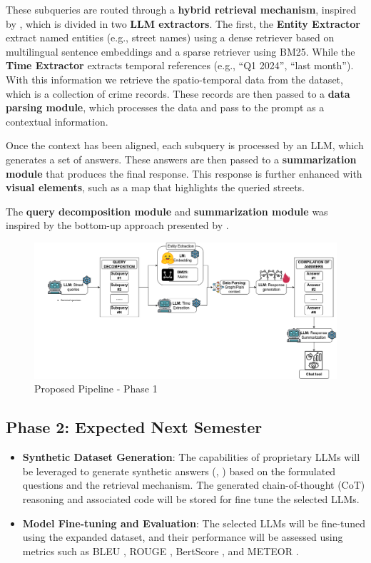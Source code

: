 These subqueries are routed through a \textbf{hybrid retrieval mechanism}, inspired by \cite{Guo2024LightRAG}, which is divided in two \textbf{LLM extractors}. The first, the \textbf{Entity Extractor} extract named entities (e.g., street names) using a dense retriever based on multilingual sentence embeddings and a sparse retriever using BM25. While the \textbf{Time Extractor} extracts temporal references (e.g., “Q1 2024”, “last month”). With this information we retrieve the spatio-temporal data from the dataset, which is a collection of crime records. These records are then passed to a \textbf{data parsing module}, which processes the data and pass to the prompt as a contextual information. 

Once the context has been aligned, each subquery is processed by an LLM, which generates a set of answers. These answers are then passed to a \textbf{summarization module} that produces the final response. This response is further enhanced with \textbf{visual elements}, such as a map that highlights the queried streets.

The \textbf{query decomposition module} and \textbf{summarization module} was inspired by the bottom-up approach presented by \cite{Deng2025VisualChronicles}.

\begin{figure}[H]
    \centering
    \includegraphics[width=\textwidth]{images/PFC3.drawio.png}
    \caption{Proposed Pipeline - Phase 1}
    \label{fig:proposal_f1}
\end{figure}

\subsection{Phase 2: Expected Next Semester}

\begin{itemize}
    \item \textbf{Synthetic Dataset Generation}: The capabilities of proprietary LLMs will be leveraged to generate synthetic answers (\cite{Nvidia2024KaggleMath}, \cite{Liu2024NLDriven}) based on the formulated questions and the retrieval mechanism. The generated chain-of-thought (CoT) reasoning and associated code will be stored for fine tune the selected LLMs.
    \item \textbf{Model Fine-tuning and Evaluation}: The selected LLMs will be fine-tuned using the expanded dataset, and their performance will be assessed using metrics such as BLEU \cite{bleuPaper}, ROUGE \cite{rougePaper}, BertScore \cite{bertscorePaper}, and METEOR \cite{meteorPaper}.
\end{itemize}


